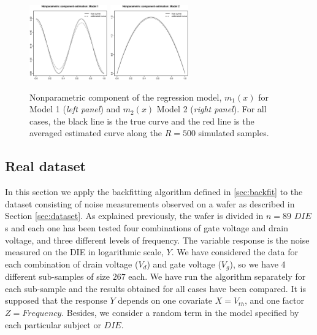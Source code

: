 \documentclass[sn-mathphys]{sn-jnl}%
\theoremstyle{thmstyleone}%
\theoremstyle{thmstyletwo}%
\theoremstyle{thmstylethree}%
\begin{document}
\begin{figure}[H]
	\centerline{\includegraphics [width=0.3\textwidth]{Fig7_sim1.eps}
		          \includegraphics [width=0.3\textwidth]{Fig7_sim2.eps} }
	\caption{Nonparametric component of the regression model,  $m_1(x)$ for Model 1 ({\it left panel}) and $m_2(x)$ Model 2 ({\it right panel}). For all cases, the black line is the true curve and the red line is the averaged estimated curve along the $R=500$ simulated samples.}
	\label{fig:estim_m}
\end{figure}

\subsection{Real dataset}\label{sec:bf_noise}

In this section we apply the backfitting algorithm defined in \ref{sec:backfit} to the dataset consisting of noise measurements observed on a wafer as  described in Section \ref{sec:dataset}. As explained previously, the wafer is divided in $n=89$ $DIE$s and each one has been tested four combinations of gate voltage and drain voltage, and three different levels of frequency. 
The variable response is the noise measured on the DIE in logarithmic scale, $Y$. We have considered the data for each combination of drain voltage ($V_d$) and gate voltage ($V_g$), so we have 4 different sub-samples of size $267$ each. We have run the algorithm separately for each sub-sample and the results obtained for all cases have been compared. 
  It is supposed that the response $Y$ depends on one covariate $X=V_{th}$, and one factor $Z=Frequency$. Besides, we consider a random term in the model specified by each particular subject or $DIE$.
\end{document}
